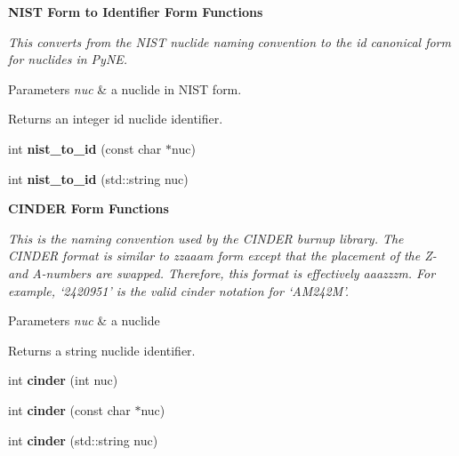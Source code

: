 \begin{Indent}\textbf{ N\+I\+ST Form to Identifier Form Functions}\par
{\em This converts from the N\+I\+ST nuclide naming convention to the id canonical form for nuclides in Py\+NE. 
\begin{DoxyParams}{Parameters}
{\em nuc} & a nuclide in N\+I\+ST form. \\
\hline
\end{DoxyParams}
\begin{DoxyReturn}{Returns}
an integer id nuclide identifier. 
\end{DoxyReturn}
}\begin{DoxyCompactItemize}
\item 
\mbox{\label{namespacepyne_1_1nucname_a3b22d255aeb2eeef64f066747a75c1e7}} 
int {\bfseries nist\+\_\+to\+\_\+id} (const char $\ast$nuc)
\item 
\mbox{\label{namespacepyne_1_1nucname_a7ef9fe9b42d5ac9063aab9a649e8dabd}} 
int {\bfseries nist\+\_\+to\+\_\+id} (std\+::string nuc)
\end{DoxyCompactItemize}
\end{Indent}
\begin{Indent}\textbf{ C\+I\+N\+D\+ER Form Functions}\par
{\em This is the naming convention used by the C\+I\+N\+D\+ER burnup library. The C\+I\+N\+D\+ER format is similar to zzaaam form except that the placement of the Z-\/ and A-\/numbers are swapped. Therefore, this format is effectively aaazzzm. For example, ‘2420951’ is the valid cinder notation for ‘\+A\+M242\+M’. 
\begin{DoxyParams}{Parameters}
{\em nuc} & a nuclide \\
\hline
\end{DoxyParams}
\begin{DoxyReturn}{Returns}
a string nuclide identifier. 
\end{DoxyReturn}
}\begin{DoxyCompactItemize}
\item 
\mbox{\label{namespacepyne_1_1nucname_a72e7d4ad5fb78e4d0f63c3aa4acfbf52}} 
int {\bfseries cinder} (int nuc)
\item 
\mbox{\label{namespacepyne_1_1nucname_aa102e2c5853761ff39fb5f228b54e587}} 
int {\bfseries cinder} (const char $\ast$nuc)
\item 
\mbox{\label{namespacepyne_1_1nucname_ade4d33508b97fd38dcca937e366f324e}} 
int {\bfseries cinder} (std\+::string nuc)
\end{DoxyCompactItemize}
\end{Indent}
